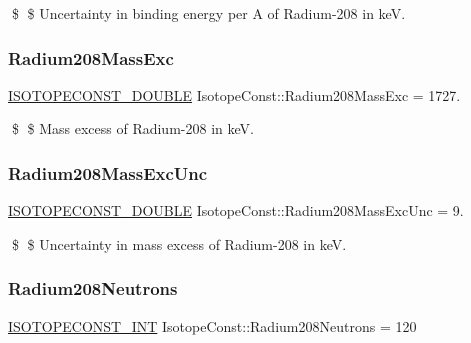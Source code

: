 \$ \$ Uncertainty in binding energy per A of Radium-\/208 in keV. \mbox{\label{group___isotope_const-_radium-_ra208_ga35364331bac6bfdc1ca9c83e753d8ff5}} 
\subsubsection{\texorpdfstring{Radium208\+Mass\+Exc}{Radium208MassExc}}
{\footnotesize\ttfamily \mbox{\hyperlink{group___isotope_const-_macros_ga8f45a7272ce02c0b4c65c44636ed719a}{I\+S\+O\+T\+O\+P\+E\+C\+O\+N\+S\+T\+\_\+\+D\+O\+U\+B\+LE}} Isotope\+Const\+::\+Radium208\+Mass\+Exc = 1727.}

\$ \$ Mass excess of Radium-\/208 in keV. \mbox{\label{group___isotope_const-_radium-_ra208_gada413d6ee798f4f7a7432e5880a5d0f5}} 
\subsubsection{\texorpdfstring{Radium208\+Mass\+Exc\+Unc}{Radium208MassExcUnc}}
{\footnotesize\ttfamily \mbox{\hyperlink{group___isotope_const-_macros_ga8f45a7272ce02c0b4c65c44636ed719a}{I\+S\+O\+T\+O\+P\+E\+C\+O\+N\+S\+T\+\_\+\+D\+O\+U\+B\+LE}} Isotope\+Const\+::\+Radium208\+Mass\+Exc\+Unc = 9.}

\$ \$ Uncertainty in mass excess of Radium-\/208 in keV. \mbox{\label{group___isotope_const-_radium-_ra208_gad40b4034b993d7e0e483eb5491aa8c6e}} 
\subsubsection{\texorpdfstring{Radium208\+Neutrons}{Radium208Neutrons}}
{\footnotesize\ttfamily \mbox{\hyperlink{group___isotope_const-_macros_ga5f18360b3e99483a35c32d789e62621c}{I\+S\+O\+T\+O\+P\+E\+C\+O\+N\+S\+T\+\_\+\+I\+NT}} Isotope\+Const\+::\+Radium208\+Neutrons = 120}

